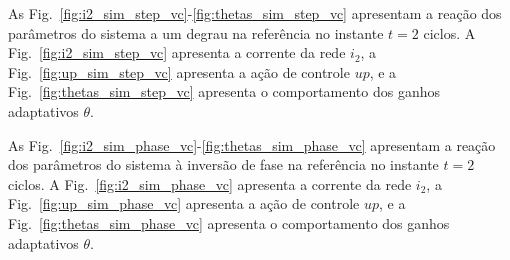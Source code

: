   \newpage

  As Fig.~\ref{fig:i2_sim_step_vc}-\ref{fig:thetas_sim_step_vc} apresentam a reação dos parâmetros do sistema a um degrau na referência no instante $t=2$ ciclos. A Fig.~\ref{fig:i2_sim_step_vc} apresenta a corrente da rede $i_2$, a Fig.~\ref{fig:up_sim_step_vc} apresenta a ação de controle $up$, e a Fig.~\ref{fig:thetas_sim_step_vc} apresenta o comportamento dos ganhos adaptativos $\theta$.

  \vfill
  \noindent
  \begin{minipage}{\textwidth}
    \makebox[\textwidth]{
      \centering
      \def\svgwidth{\textwidth}
      }
    \label{fig:i2_sim_step_vc}
  \end{minipage}

  \vfill

  \newpage

  \vfill
  \noindent
  \begin{minipage}{\textwidth}
    \makebox[\textwidth]{
      \centering
      \def\svgwidth{\textwidth}
      }
    \label{fig:up_sim_step_vc}
  \end{minipage}

  \vfill
  \noindent
  \begin{minipage}{\textwidth}
    \makebox[\textwidth]{
      \centering
      \def\svgwidth{\textwidth}
      }
    \label{fig:thetas_sim_step_vc}
  \end{minipage}
  \vfill

  \newpage

  As Fig.~\ref{fig:i2_sim_phase_vc}-\ref{fig:thetas_sim_phase_vc} apresentam a reação dos parâmetros do sistema à inversão de fase na referência no instante $t=2$ ciclos. A Fig.~\ref{fig:i2_sim_phase_vc} apresenta a corrente da rede $i_2$, a Fig.~\ref{fig:up_sim_phase_vc} apresenta a ação de controle $up$, e a Fig.~\ref{fig:thetas_sim_phase_vc} apresenta o comportamento dos ganhos adaptativos $\theta$.

  \vfill
  \noindent
  \begin{minipage}{\textwidth}
    \makebox[\textwidth]{
      \centering
      \def\svgwidth{\textwidth}
      }
    \label{fig:i2_sim_phase_vc}
  \end{minipage}
  \vfill

